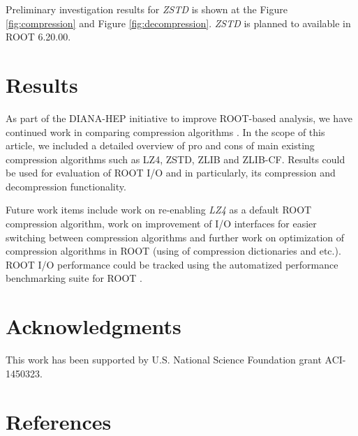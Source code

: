 \documentclass[12pt]{iopart}
\begin{document}
Preliminary investigation results for \textit{ZSTD} is shown at the Figure \ref{fig:compression} and Figure \ref{fig:decompression}. \textit{ZSTD} is planned to available in ROOT 6.20.00.

\section{Results}
As part of the DIANA-HEP initiative to improve ROOT-based analysis, we have continued work in comparing compression algorithms \cite{brianzhe}. In the scope of this article, we included a detailed overview of pro and cons of main existing compression algorithms such as LZ4, ZSTD, ZLIB and ZLIB-CF. Results could be used for evaluation of ROOT I/O and in particularly, its compression and decompression functionality. 

Future work items include work on re-enabling \textit{LZ4} as a default ROOT compression algorithm, work on improvement of I/O interfaces for easier switching between compression algorithms and further work on optimization of compression algorithms in ROOT (using of compression dictionaries and etc.). ROOT I/O performance could be tracked using the automatized performance benchmarking suite for ROOT \cite{rootbench}.

\section{Acknowledgments}

This work has been supported by U.S. National Science Foundation grant ACI-1450323.

\section{References}
\end{document}
